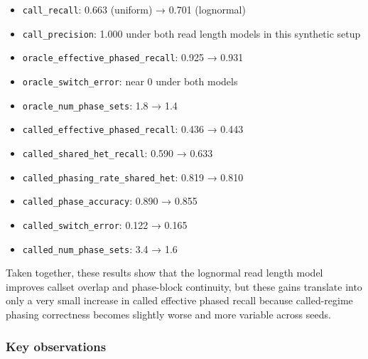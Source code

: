\documentclass[
]{article}
\providecommand{\tightlist}{%
  \setlength{\itemsep}{0pt}\setlength{\parskip}{0pt}}
\begin{document}
\begin{itemize}
\tightlist
\item
  \texttt{call\_recall}: 0.663 (uniform) → 0.701 (lognormal)
\item
  \texttt{call\_precision}: 1.000 under both read length models in this
  synthetic setup
\item
  \texttt{oracle\_effective\_phased\_recall}: 0.925 → 0.931
\item
  \texttt{oracle\_switch\_error}: near 0 under both models
\item
  \texttt{oracle\_num\_phase\_sets}: 1.8 → 1.4
\item
  \texttt{called\_effective\_phased\_recall}: 0.436 → 0.443
\item
  \texttt{called\_shared\_het\_recall}: 0.590 → 0.633
\item
  \texttt{called\_phasing\_rate\_shared\_het}: 0.819 → 0.810
\item
  \texttt{called\_phase\_accuracy}: 0.890 → 0.855
\item
  \texttt{called\_switch\_error}: 0.122 → 0.165
\item
  \texttt{called\_num\_phase\_sets}: 3.4 → 1.6
\end{itemize}

Taken together, these results show that the lognormal read length model
improves callset overlap and phase-block continuity, but these gains
translate into only a very small increase in called effective phased
recall because called-regime phasing correctness becomes slightly worse
and more variable across seeds.

\subsubsection{Key observations}\label{key-observations-4}
\end{document}
